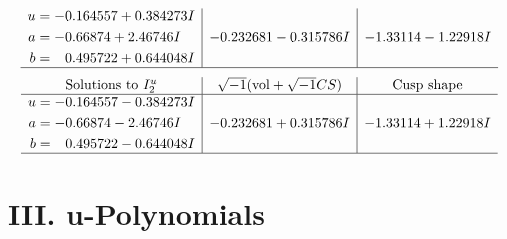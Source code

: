 \documentclass[1p]{elsarticle_modified}
\theoremstyle{definition}
\newcommand{\I}{\sqrt{-1}}
\begin{document}
$$\begin{array}{c|c|c}
\begin{aligned}
u &= -0.164557 + 0.384273 I \\
a &= -0.66874 + 2.46746 I \\
b &= \phantom{-}0.495722 + 0.644048 I\end{aligned}
 & -0.232681 - 0.315786 I & -1.33114 - 1.22918 I\\
 \hline 
 \end{array}$$\newpage$$\begin{array}{c|c|c}  
\text{Solutions to }I^u_{2}& \I (\text{vol} + \sqrt{-1}CS) & \text{Cusp shape}\\
 \hline 
\begin{aligned}
u &= -0.164557 - 0.384273 I \\
a &= -0.66874 - 2.46746 I \\
b &= \phantom{-}0.495722 - 0.644048 I\end{aligned}
 & -0.232681 + 0.315786 I & -1.33114 + 1.22918 I\\
 \hline 
 \end{array}$$\newpage
\newpage\renewcommand{\arraystretch}{1}
\centering \section*{ III. u-Polynomials}
\end{document}
